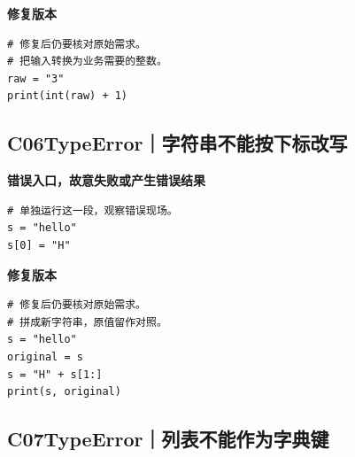 \textbf{修复版本}

\begin{lstlisting}[title={\code{case_05.py}}]
# 修复后仍要核对原始需求。
# 把输入转换为业务需要的整数。
raw = "3"
print(int(raw) + 1)
\end{lstlisting}


\subsection*{C06\enspace TypeError｜字符串不能按下标改写}





\textbf{错误入口，故意失败或产生错误结果}

\begin{lstlisting}[style=errorcode,title={错误复现（故意失败或错误结果）：\code{case_06_bad.py.txt}}]
# 单独运行这一段，观察错误现场。
s = "hello"
s[0] = "H"
\end{lstlisting}

\textbf{修复版本}

\begin{lstlisting}[title={\code{case_06.py}}]
# 修复后仍要核对原始需求。
# 拼成新字符串，原值留作对照。
s = "hello"
original = s
s = "H" + s[1:]
print(s, original)
\end{lstlisting}


\subsection*{C07\enspace TypeError｜列表不能作为字典键}




